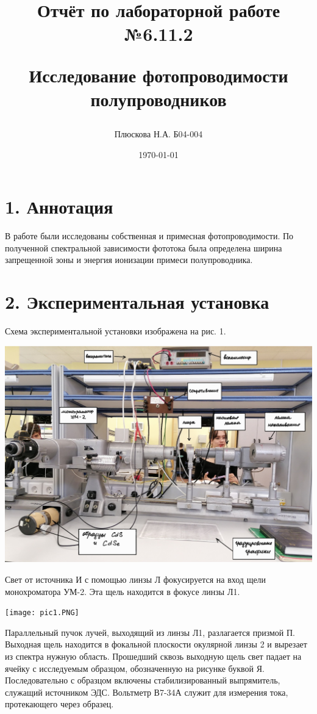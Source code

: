 \documentclass[a4paper,12pt]{report}
\title{Отчёт по лабораторной работе №6.11.2

Исследование фотопроводимости полупроводников}
\author{Плюскова Н.А. Б04-004 }
\date{\today}
\begin{document}
\maketitle

\section*{1. Аннотация}

В работе были исследованы собственная и примесная фотопроводимости. По полученной спектральной зависимости фототока была определена ширина запрещенной зоны и энергия ионизации примеси полупроводника.

\section*{2. Экспериментальная установка}

Схема экспериментальной установки изображена на рис. 1. 

\begin{center}
    \includegraphics[width = \linewidth]{ustanovka.jpg}
\end{center}


Свет от источника И с помощью линзы Л фокусируется на вход щели монохроматора УМ-2. Эта щель находится в фокусе линзы Л1. 

\begin{center}
    \texttt{[image: pic1.PNG]}
\end{center}


Параллельный пучок лучей, выходящий из линзы Л1, разлагается призмой П. Выходная щель находится в фокальной плоскости окулярной линзы 2 и вырезает из спектра нужную область. Прошедший сквозь выходную щель свет падает на ячейку с исследуемым образцом, обозначенную на рисунке буквой Я. Последовательно с образцом включены стабилизированный выпрямитель, служащий источником ЭДС. Вольтметр В7-34А служит для измерения тока, протекающего через образец.
\end{document}
